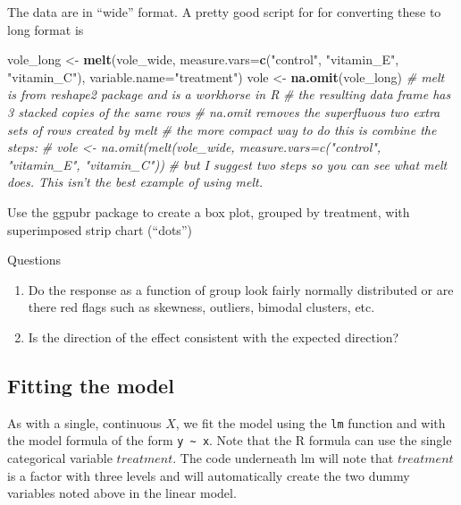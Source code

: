\documentclass[]{book}
\newenvironment{Shaded}{\begin{snugshade}}{\end{snugshade}}
\newcommand{\KeywordTok}[1]{\textcolor[rgb]{0.13,0.29,0.53}{\textbf{#1}}}
\newcommand{\DataTypeTok}[1]{\textcolor[rgb]{0.13,0.29,0.53}{#1}}
\newcommand{\StringTok}[1]{\textcolor[rgb]{0.31,0.60,0.02}{#1}}
\newcommand{\CommentTok}[1]{\textcolor[rgb]{0.56,0.35,0.01}{\textit{#1}}}
\newcommand{\NormalTok}[1]{#1}
\providecommand{\tightlist}{%
  \setlength{\itemsep}{0pt}\setlength{\parskip}{0pt}}
\begin{document}
The data are in ``wide'' format. A pretty good script for for converting
these to long format is

\begin{Shaded}
\begin{Highlighting}[]
\NormalTok{vole_long <-}\StringTok{ }\KeywordTok{melt}\NormalTok{(vole_wide, }\DataTypeTok{measure.vars=}\KeywordTok{c}\NormalTok{(}\StringTok{"control"}\NormalTok{, }\StringTok{"vitamin_E"}\NormalTok{, }\StringTok{"vitamin_C"}\NormalTok{), }\DataTypeTok{variable.name=}\StringTok{"treatment"}\NormalTok{)}
\NormalTok{vole <-}\StringTok{ }\KeywordTok{na.omit}\NormalTok{(vole_long)}
\CommentTok{# melt is from reshape2 package and is a workhorse in R}
\CommentTok{# the resulting data frame has 3 stacked copies of the same rows}
\CommentTok{# na.omit removes the superfluous two extra sets of rows created by melt}
\CommentTok{# the more compact way to do this is combine the steps:}
\CommentTok{# vole <- na.omit(melt(vole_wide, measure.vars=c("control", "vitamin_E", "vitamin_C"))}
\CommentTok{# but I suggest two steps so you can see what melt does. This isn't the best example of using melt.}
\end{Highlighting}
\end{Shaded}

Use the ggpubr package to create a box plot, grouped by treatment, with
superimposed strip chart (``dots'')

Questions

\begin{enumerate}
\def\labelenumi{\arabic{enumi}.}
\setcounter{enumi}{1}
\tightlist
\item
  Do the response as a function of group look fairly normally
  distributed or are there red flags such as skewness, outliers, bimodal
  clusters, etc.
\item
  Is the direction of the effect consistent with the expected direction?
\end{enumerate}

\subsection{Fitting the model}\label{fitting-the-model}

As with a single, continuous \(X\), we fit the model using the
\texttt{lm} function and with the model formula of the form
\texttt{y\ \textasciitilde{}\ x}. Note that the R formula can use the
single categorical variable \(treatment\). The code underneath lm will
note that \(treatment\) is a factor with three levels and will
automatically create the two dummy variables noted above in the linear
model.
\end{document}
